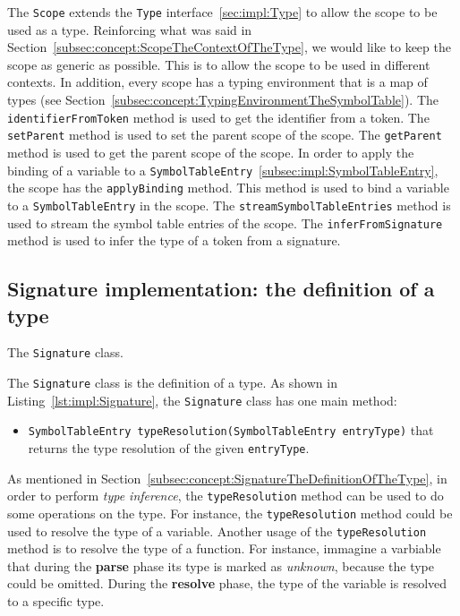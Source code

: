 The \texttt{Scope} extends the \texttt{Type} interface~\ref{sec:impl:Type} to allow the scope to be used as a type. Reinforcing what was said in Section~\ref{subsec:concept:ScopeTheContextOfTheType}, we would like to keep the scope as generic as possible. This is to allow the scope to be used in different contexts. In addition, every scope has a typing environment that is a map of types (see Section~\ref{subsec:concept:TypingEnvironmentTheSymbolTable}). The \texttt{identifierFromToken} method is used to get the identifier from a token. The \texttt{setParent} method is used to set the parent scope of the scope. The \texttt{getParent} method is used to get the parent scope of the scope.
In order to apply the binding of a variable to a \texttt{SymbolTableEntry}~\ref{subsec:impl:SymbolTableEntry}, the scope has the \texttt{applyBinding} method. This method is used to bind a variable to a \texttt{SymbolTableEntry} in the scope. The \texttt{streamSymbolTableEntries} method is used to stream the symbol table entries of the scope. The \texttt{inferFromSignature} method is used to infer the type of a token from a signature.

\subsection{Signature implementation: the definition of a type}\label{subsec:impl:Signature}

\begin{Listing}[tbh]
    \centering
    \caption{The \texttt{Signature} class.}
    \label{lst:impl:Signature}
\end{Listing}

The \texttt{Signature} class is the definition of a type. As shown in Listing~\ref{lst:impl:Signature}, the \texttt{Signature} class has one main method:
\begin{itemize}
    \item \texttt{SymbolTableEntry typeResolution(SymbolTableEntry entryType)} that returns the type resolution of the given \texttt{entryType}.
\end{itemize}

As mentioned in Section~\ref{subsec:concept:SignatureTheDefinitionOfTheType}, in order to perform \textit{type inference}, the \texttt{typeResolution} method can be used to do some operations on the type. For instance, the \texttt{typeResolution} method could be used to resolve the type of a variable. Another usage of the \texttt{typeResolution} method is to resolve the type of a function. For instance, immagine a varbiable that during the \textbf{parse} phase its type is marked as \textit{unknown}, because the type could be omitted. During the \textbf{resolve} phase, the type of the variable is resolved to a specific type.

